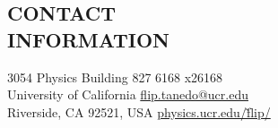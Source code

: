 \documentclass[margin,line]{resume}
\begin{document}
\begin{resume}



\section{\footnotesize \sc
\sffamily 
{}CONTACT\\INFORMATION
}

3054 Physics Building
\hfill 
{ 827 6168 x26168}
\vspace{0mm}%
\\
%
\vspace{0mm}%
University of California
\hfill
\href{mailto:flip.tanedo@ucr.edu}{\myweb flip.tanedo@ucr.edu}
\vspace{0mm}%
\\
\vspace{0mm}%
Riverside, CA 92521, USA
\hfill
\href{http://physics.ucr.edu/~flip/}{\myweb physics.ucr.edu/\~flip/}
\vspace{0mm}%
\\
\vspace{-4.5mm}%
\vspace{-2mm}

%
%
%



\end{resume}
\end{document}

